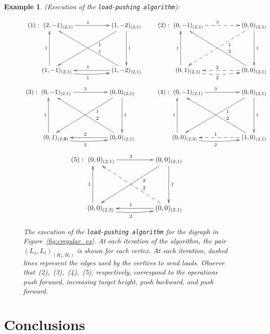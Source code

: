 \documentclass[final]{siamltex}
\newtheorem{example}[theorem]{Example}
\begin{document}
\begin{example}{\mbox{}\textup{({Execution of the
    {\texttt{load-pushing algorithm}\xspace}}):}}
  \begin{figure}[htb]
    \[
    \xymatrix{ \ (1): \
      (2,-1)_{(2,1)} \ar[rr]^{1}  & &(1,-2)_{(2,1)} \ar[dd]^1 \ar[ddll]^{\ \ \ \ \ \  1} \\
      & &\\
      \ \ \ \ \ \ \ (1,-1)_{(2,1)} \ar[uu]^1 \ar@/_/[rr]_1 & &
      (1,-2)_{(2,1)} \ar[ll]_1 \ar[lluu]_{\ \ \ \ \ \ 1} } \qquad 
      \xymatrix{ (2):
      \
      (0,-1)_{(2,1)} \ar@{-->}[rr]^{3}  & &(0,0)_{(2,1)} \ar[dd]^1 \ar@{-->}[ddll]^{\ \ \ \ \ \  2} \\
      & &\\
      \ \ \ \ \ \ \ (0,1)_{(2,1)} \ar[uu]^1 \ar@/_/@{-->}[rr]_2 & &
      (0,0)_{(2,1)} \ar@{-->}[ll]_2 \ar[lluu]_{\ \ \ \ \ \ 1} }
    \]
    \[
    \xymatrix{
      (3): \ 
      (0,-1)_{(2,1)} \ar[rr]^{3}  & &(0,0)_{(2,1)} \ar[dd]^1 \ar[ddll]^{\ \ \ \ \ \  2} \\
      & &\\ 
      \ \ \ \ \ \ \ (0,1)_{(2,\textbf{3})} \ar[uu]^1 \ar@/_/[rr]_2 & & (0,0)_{(2,1)} \ar[ll]_2 \ar[lluu]_{\ \ \ \ \ \  1} }
    \qquad     
    \xymatrix{
      \ \ \ (4): \ 
      (0,-1)_{(2,1)} \ar[rr]^{3}  & &(0,0)_{(2,1)} \ar[dd]^1 \ar[ddll]^{\ \ \ \ \ \   2} \\
      & &\\ 
      \ \ \ \ \ \ \ (0,0)_{(2,3)} \ar[uu]^1 \ar@/_/[rr]_2 & & (1,0)_{(2,1)} \ar@{-->}[ll]_1 \ar[lluu]_{\ \ \ \ \ \  1} }
    \]
    \[
    \xymatrix{
      (5): \ 
      (0,0)_{(2,1)} \ar[rr]^{3}  & &(0,0)_{(2,1)} \ar[dd]^1 \ar[ddll]^{\ \ \ \ \ \   2} \\
      & &\\ 
      \ \ \ \ \ \ \ (0,0)_{(2,3)} \ar[uu]^1 \ar@/_/[rr]_2 & & (0,0)_{(2,1)} \ar[ll]_1 \ar@{-->}[lluu]_{\ \ \ \ \ \    2} }
    \]
    \caption{The execution of the {\texttt{load-pushing algorithm}\xspace} for the digraph in
      Figure~\ref{fig:cregular_ex}. At each iteration of the
      algorithm, the pair $ (L_s,L_t)_{(H_s,H_t)} $ is shown for each
      vertex. At each iteration, dashed lines represent the edges used
      by the vertices to send loads. Observe that~(2),~(3),~(4),~(5),
      respectively, correspond to the operations push forward,
      increasing target height, push backward, and push forward.}
    \label{fig:cregular_ex_exe}
  \end{figure}
\end{example}

\section{Conclusions}\label{sec:conclusion_sec}
\end{document}
